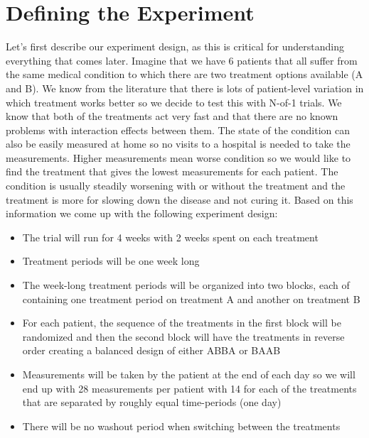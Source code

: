 \documentclass[12pt,a4paper,leqno]{report}
\theoremstyle{plain}
\theoremstyle{definition}
\theoremstyle{remark}
\begin{document}
\section{Defining the Experiment}

Let's first describe our experiment design, as this is critical for understanding
everything that comes later. Imagine that we have 6 patients that all suffer from the
same medical condition to which there are two treatment options available (A and
B). We know from the
literature that there is lots of patient-level variation in which treatment works better
so we decide to test this with N-of-1 trials. We know that both of the treatments act
very fast and that there are no known problems with interaction effects between them.
The state of the condition can also be easily measured at home so no visits to
a hospital is needed to take the measurements. Higher measurements mean worse condition
so we would like to find the treatment that gives the lowest measurements for each
patient. The condition is usually steadily
worsening with or without the treatment and the treatment is more for slowing down the
disease and not curing it. Based on this information we come up with the following experiment design:

\begin{itemize}
    \item The trial will run for 4 weeks with 2 weeks spent on each treatment
    \item Treatment periods will be one week long
    \item The week-long treatment periods will be organized into two blocks, each of
    containing one treatment period on treatment A and another on treatment B
    \item For each patient, the sequence of the treatments in the first block will be randomized and then
    the second block will have the treatments in reverse order creating a balanced
    design of either ABBA or BAAB
    \item Measurements will be taken by the patient at the end of each day so we will end up with
    28 measurements per patient with 14 for each of the treatments that are separated by
    roughly equal time-periods (one day)
    \item There will be no washout period when switching between the treatments
\end{itemize}
\end{document}
